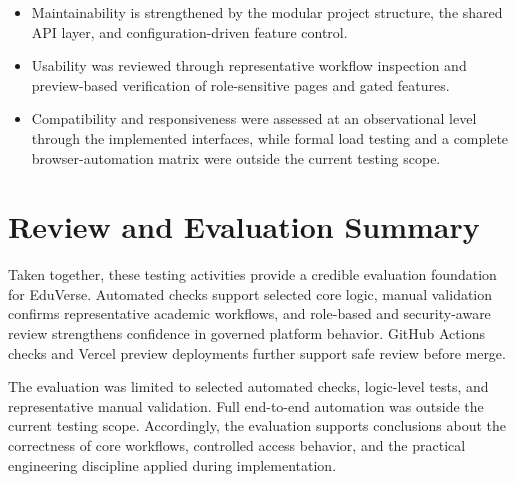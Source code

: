 \begin{itemize}
  \item Maintainability is strengthened by the modular project structure, the
    shared API layer, and configuration-driven feature control.
  \item Usability was reviewed through representative workflow inspection and
    preview-based verification of role-sensitive pages and gated features.
  \item Compatibility and responsiveness were assessed at an observational
    level through the implemented interfaces, while formal load testing and a
    complete browser-automation matrix were outside the current testing scope.
\end{itemize}

\section{Review and Evaluation Summary}\label{sec:review_evaluation_summary}

Taken together, these testing activities provide a credible evaluation
foundation for EduVerse. Automated checks support selected core logic, manual validation
confirms representative academic workflows, and role-based and security-aware
review strengthens confidence in governed platform behavior. GitHub Actions
checks and Vercel preview deployments further support safe review before merge.

The evaluation was limited to selected automated checks, logic-level tests, and representative manual validation. Full end-to-end automation was outside the current testing scope. Accordingly, the evaluation supports conclusions about the correctness of core workflows, controlled access behavior, and the practical engineering discipline applied during implementation.


